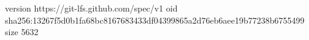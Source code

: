 version https://git-lfs.github.com/spec/v1
oid sha256:13267f5d0b1fa68bc8167683433df04399865a2d76eb6aee19b77238b6755499
size 5632
